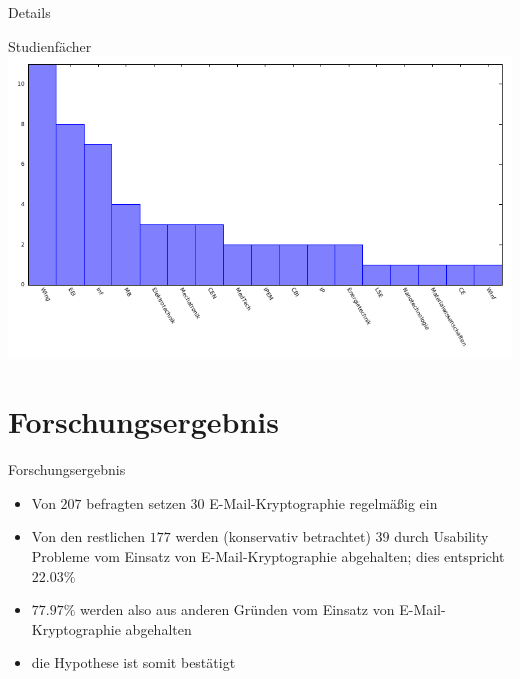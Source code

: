 \documentclass[]{beamer}
\begin{document}
\begin{frame}{Details}
	\begin{center}
		Studienfächer
		\includegraphics[scale=0.9]{plots/noplan.pdf}
	\end{center}
\end{frame}

\section{Forschungsergebnis}
\begin{frame}{Forschungsergebnis}
\begin{itemize}
	\item Von $207$ befragten setzen $30$ E-Mail-Kryptographie regelmäßig ein
	\item Von den restlichen $177$ werden (konservativ betrachtet) $39$ durch Usability Probleme
		vom Einsatz von E-Mail-Kryptographie abgehalten; dies entspricht $22.03\%$
	\item $77.97\%$ werden also aus anderen Gründen vom Einsatz von E-Mail-Kryptographie abgehalten
	\item<2> die Hypothese ist somit bestätigt
\end{itemize}
\end{frame}
\end{document}
